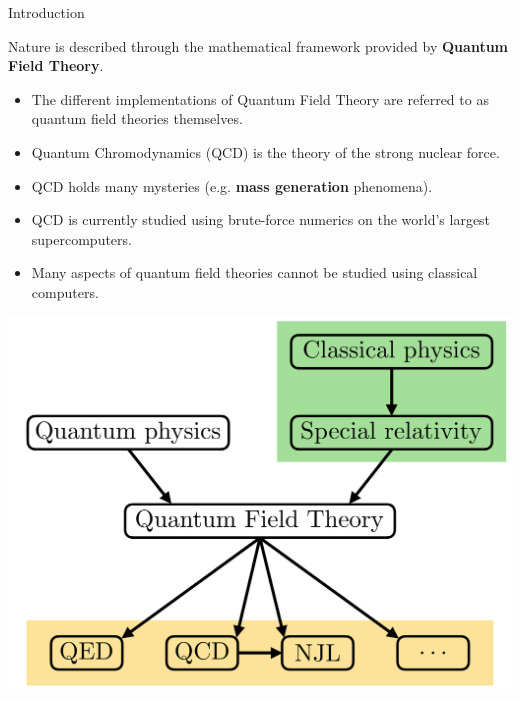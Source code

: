 \documentclass[9pt, handout, aspectratio=169]{beamer}	%
\begin{document}
\begin{frame}{Introduction}

	Nature is described through the mathematical framework provided by \textbf{Quantum Field Theory}.

	\begin{multicols}{2}

		\begin{itemize}
			\item<2-> The different implementations of Quantum Field Theory are referred to as quantum field theories themselves.
			\item<3-> Quantum Chromodynamics (QCD) is the theory of the strong nuclear force.
			\item<3-> QCD holds many mysteries (e.g. \textbf{mass generation} phenomena).
			\item<4-> QCD is currently studied using brute-force numerics on the world’s largest supercomputers.
			\item<4-> Many aspects of quantum field theories cannot be studied using classical computers.
		\end{itemize}

		\begin{center}
			\includegraphics[width=.40\paperwidth]{Figures/quantum-field-theory}
		\end{center}

	\end{multicols}

\end{frame}

\end{document}
